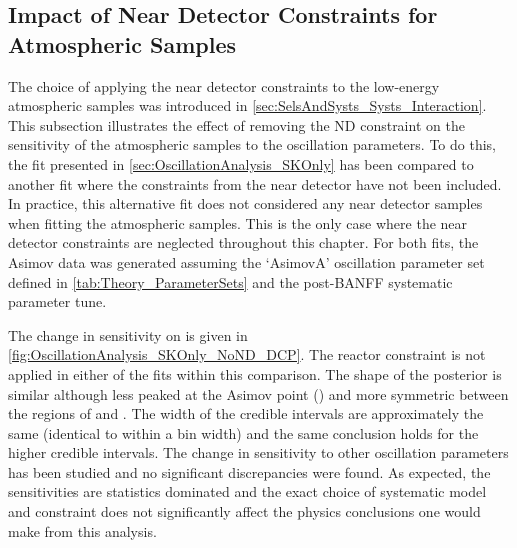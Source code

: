 
\clearpage
\subsection{Impact of Near Detector Constraints for Atmospheric Samples}
\label{sec:OscillationAnalysis_SKOnly_NoND}

The choice of applying the near detector constraints to the low-energy atmospheric samples was introduced in \autoref{sec:SelsAndSysts_Systs_Interaction}. This subsection illustrates the effect of removing the ND constraint on the sensitivity of the atmospheric samples to the oscillation parameters. To do this, the fit presented in \autoref{sec:OscillationAnalysis_SKOnly} has been compared to another fit where the constraints from the near detector have not been included. In practice, this alternative fit does not considered any near detector samples when fitting the atmospheric samples. This is the only case where the near detector constraints are neglected throughout this chapter. For both fits, the Asimov data was generated assuming the `AsimovA' oscillation parameter set defined in \autoref{tab:Theory_ParameterSets} and the post-BANFF systematic parameter tune.

The change in sensitivity on  is given in \autoref{fig:OscillationAnalysis_SKOnly_NoND_DCP}. The reactor constraint is not applied in either of the fits within this comparison. The shape of the posterior is similar although less peaked at the Asimov point () and more symmetric between the regions of  and . The width of the \quickmath{1\sigma} credible intervals are approximately the same (identical to within a bin width) and the same conclusion holds for the higher credible intervals. The change in sensitivity to other oscillation parameters has been studied and no significant discrepancies were found. As expected, the sensitivities are statistics dominated and the exact choice of systematic model and constraint does not significantly affect the physics conclusions one would make from this analysis.

